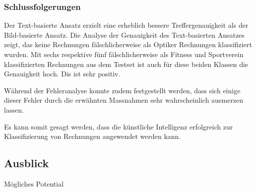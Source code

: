 \subsubsection{Schlussfolgerungen}


Der Text-basierte Ansatz erzielt eine erheblich bessere Treffergenauigkeit als der Bild-basierte Ansatz. Die Analyse der Genauigkeit des Text-basierten Ansatzes zeigt, das keine Rechnungen fälschlicherweise als Optiker Rechnungen klassifiziert wurden. Mit sechs respektive fünf fälschlicherweise als Fitness und Sportverein klassifizierten Rechnungen aus dem Testset ist auch für diese beiden Klassen die Genauigkeit hoch. Dis ist sehr positiv.

Während der Fehleranalyse konnte zudem festgestellt werden, dass sich einige dieser Fehler durch die erwähnten Massnahmen sehr wahrscheinlich ausmerzen lassen.

Es kann somit gesagt werden, dass die künstliche Intelligenz erfolgreich zur Klassifizierung von Rechnungen angewendet werden kann.


\subsection{Ausblick}

Mögliches Potential